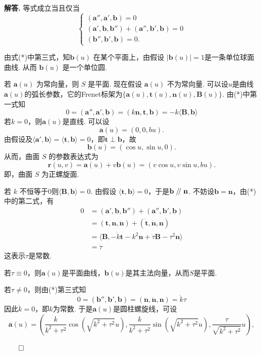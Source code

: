 \documentclass[12pt, a4paper, oneside]{ctexart}
\newenvironment{solution}{\par\noindent\textbf{解答. }}{\hfill$\qed$\par}
\renewcommand{\parallel}{\mathrel{/\mskip-4mu/}}
\begin{document}
\begin{solution}
		等式成立当且仅当
		\[
		\begin{cases}
			( \mathbf{a}'', \mathbf{a}', \mathbf{b}) = 0 \\
			( \mathbf{a}', \mathbf{b}, \mathbf{b}'' ) +  (\mathbf{a}'', \mathbf{b}', \mathbf{b}) = 0 \\
			(\mathbf{b}'', \mathbf{b}', \mathbf{b}) = 0.\tag{*}
		\end{cases}
		\]
		
		由式(*)中第三式，知$\mathbf{b}(u)$ 在某个平面上，由假设 $|\mathbf{b}(u)| = 1$是一条单位球面曲线. 从而 $\mathbf{b}(u)$ 是一个单位圆.
		
		若 $\mathbf{a}(u)$ 为常向量，则 $S$ 是平面. 现在假设 $\mathbf{a}(u)$ 不为常向量. 可以设$u$是曲线$\mathbf{a}(u)$的弧长参数，它的Frenet标架为$\{\mathbf{a}(u), \mathbf{t}(u), \mathbf{n}(u), \mathbf{B}(u)\}$. 由(*)中第一式知\[ 0 = ( \mathbf{a}'', \mathbf{a}', \mathbf{b}) = (k\mathbf{n}, \mathbf{t}, \mathbf{b}) = -k\langle\mathbf{B},\mathbf{b}\rangle\]若$k=0$，则$\mathbf{a}(u)$是直线. 可以设
		\[
		\mathbf{a}(u) = (0, 0, bu).
		\]
		由假设及$\langle \mathbf{a}', \mathbf{b} \rangle = \langle \mathbf{t}, \mathbf{b} \rangle =0$，即$\mathbf{t}\perp \mathbf{b}$，故
		\[
		\mathbf{b}(u) = (\cos u, \sin u, 0).
		\]
		从而，曲面 $S$ 的参数表达式为
		\[
		\mathbf{r}(u, v) = \mathbf{a}(u) + v \mathbf{b}(u) = (v \cos u, v \sin u, bu).
		\]
		即，曲面 $S$ 为正螺旋面.
		
		若 $k$ 不恒等于$0$则$\langle\mathbf{B},\mathbf{b}\rangle=0$. 由假设 $\langle \mathbf{t}, \mathbf{b} \rangle =0$，于是$\mathbf{b}\parallel\mathbf{n}$. 不妨设$\mathbf{b} = \mathbf{n}$，由(*)中的第二式，有\begin{align*}
			0 &=  ( \mathbf{a}', \mathbf{b}, \mathbf{b}'' ) +  (\mathbf{a}'', \mathbf{b}', \mathbf{b})\\ &= (\mathbf{t}, \mathbf{n}, \ddot{\mathbf{n}}) + (\dot{\mathbf{t}}, \dot{\mathbf{n}}, \mathbf{n})\\ &=\langle \mathbf{B}, -\dot{k}\mathbf{t} - k^{2}\mathbf{n} + \dot{\tau}\mathbf{B} - \tau^{2}\mathbf{n}\rangle \\ &=\dot{\tau}
		\end{align*} 
		这表示$\tau$是常数.
		
		若$\tau\equiv0$，则$\mathbf{a}(u)$是平面曲线，$\mathbf{b}(u)$是其主法向量，从而$S$是平面.
		
		若$\tau\neq0$，则由(*)第三式知\[ 0 = (\mathbf{b}'', \mathbf{b}', \mathbf{b}) = (\ddot{\mathbf{n}}, \dot{\mathbf{n}}, \mathbf{n}) =  \dot{k}\tau\]因此$\dot{k} = 0$，即$k$为常数. 于是$\mathbf{a}(u)$是圆柱螺旋线，可设\[
		\mathbf{a}(u) = 
		\left(
		\frac{k}{k^2 + \tau^2} \cos\left(\sqrt{k^2 + \tau^2} u\right),
		\frac{k}{k^2 + \tau^2} \sin\left(\sqrt{k^2 + \tau^2} u\right),
		\frac{\tau}{\sqrt{k^2 + \tau^2}} u
		\right),
		\]
		

\end{solution}
\end{document}
